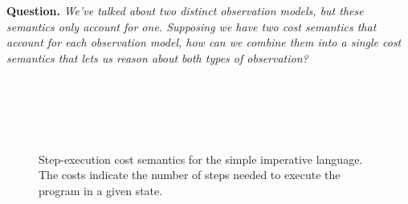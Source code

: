 \documentclass[11pt,twoside]{scrartcl}
\begin{document}
\textbf{Question.} \emph{We've talked about two distinct observation models, but these semantics only account for one. Supposing we have two cost semantics that account for each observation model, how can we combine them into a single cost semantics that lets us reason about both types of observation?}

\newcommand{\ceval}[4]{\langle #1, #2 \rangle \Downarrow_{#4} #3}
\begin{figure}
\centering
{}
\quad
{}
\quad
{}
\quad
{}
\\[1em]
\quad
{}
\quad
{}
\\[1em]
\quad
{}
\\[1em]
\quad
{}
\\[1em]
\quad
{}

\caption{Step-execution cost semantics for the simple imperative language. The costs indicate the number of steps needed to execute the program in a given state.}
\label{fig:costsemantics}
\end{figure}
\end{document}
